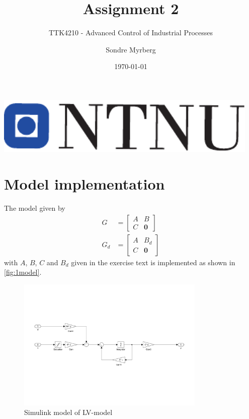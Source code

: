 \documentclass[a4paper]{scrartcl}
\title{Assignment 2}
\subtitle{TTK4210 - Advanced Control of Industrial Processes}
\author{Sondre Myrberg}
\date{\today}
\begin{document}
\hypersetup{pageanchor=false}
\begin{titlepage}
    \maketitle
    \vfill
    \vfill
    \vfill
    \vfill
    \vfill
    \includegraphics[width=0.95\textwidth]{../ntnu_logo.pdf}
    \vfill
    \vfill
\end{titlepage}
\hypersetup{pageanchor=true}

\section{Model implementation}
The model given by
\begin{equation}
	\begin{aligned}
		G &= \left[
		\begin{array}{c|c}
			A & B \\
			\hline
			C & \bm{0}
		\end{array}
		\right]
		\\
		G_d &= \left[
		\begin{array}{c|c}
			A & B_d \\
			\hline
			C & \bm{0}
		\end{array}
		\right]
	\end{aligned}
\end{equation}
with $A$, $B$, $C$ and $B_d$ given in the exercise text is implemented as shown in \autoref{fig:1model}.
\begin{figure}[ht!]
	\centering
	\includegraphics[width=0.8\textwidth]{fig/LV.pdf}
	\caption{Simulink model of LV-model}
	\label{fig:1model}
\end{figure}
\end{document}
